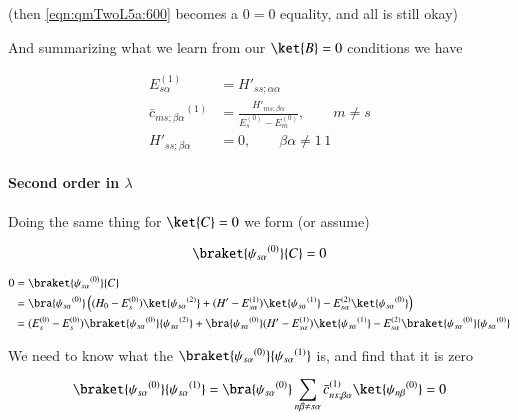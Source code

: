 (then \ref{eqn:qmTwoL5a:600} becomes a $0 = 0$ equality, and all is still okay)

And summarizing what we learn from our $\ket{B} = 0$ conditions we have

\begin{align}\label{eqn:qmTwoL5a:620}
E_{s \alpha}^{(1)} &= {H'}_{ss ; \alpha \alpha} \\
{\bar{c}_{ms ; \beta \alpha}}^{(1)}
&=
\frac{{H'}_{ms ; \beta \alpha} }
{ E_s^{(0)} - E_m^{(0)} }, \qquad {m \ne s} \\
{H'}_{ss ; \beta \alpha} &= 0, \qquad \beta \alpha \ne 1\,1
\end{align}

\paragraph{Second order in $\lambda$}

Doing the same thing for $\ket{C} = 0$ we form (or assume)

\begin{equation}\label{eqn:qmTwoL5a:640}
\braket{{\psi_{s \alpha}}^{(0)}}{C} = 0 
\end{equation}

\begin{align*}
0 
&= \braket{{\psi_{s \alpha}}^{(0)}}{C}  \\
&=
\bra{{\psi_{s \alpha}}^{(0)}}
\left(
(H_0 - E_s^{(0)}) \ket{{\psi_{s \alpha}}^{(2)}} 
+(H' - E_{s \alpha}^{(1)}) \ket{{\psi_{s \alpha}}^{(1)}} 
-E_{s \alpha}^{(2)} \ket{{\psi_{s \alpha}}^{(0)}}  
\right) \\
&=
(E_s^{(0)} - E_s^{(0)}) 
\braket{{\psi_{s \alpha}}^{(0)}}{{\psi_{s \alpha}}^{(2)}} 
+
\bra{{\psi_{s \alpha}}^{(0)}}
(H' - E_{s \alpha}^{(1)}) \ket{{\psi_{s \alpha}}^{(1)}} 
-E_{s \alpha}^{(2)} \braket{{\psi_{s \alpha}}^{(0)}}{{\psi_{s \alpha}}^{(0)}} 
\end{align*}

We need to know what the $\braket{{\psi_{s \alpha}}^{(0)}}{{\psi_{s \alpha}}^{(1)}}$ is, and find that it is zero

\begin{equation}\label{eqn:qmTwoL5a:660}
\braket{{\psi_{s \alpha}}^{(0)}}{{\psi_{s \alpha}}^{(1)}}
=
\bra{{\psi_{s \alpha}}^{(0)}}
\sum_{n\beta \ne s\alpha} {\bar{c}_{ns;\beta \alpha}}^{(1)} \ket{{\psi_{n \beta}}^{(0)}} = 0
\end{equation}

